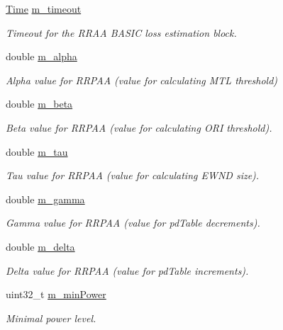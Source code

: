 \begin{DoxyCompactItemize}
\hyperlink{classns3_1_1Time}{Time} \hyperlink{classns3_1_1RrpaaWifiManager_a86e264f2035d972d66a105a9c4c6d5f3}{m\+\_\+timeout}
\begin{DoxyCompactList}\small\item\em Timeout for the R\+R\+AA B\+A\+S\+IC loss estimation block. \end{DoxyCompactList}\item 
double \hyperlink{classns3_1_1RrpaaWifiManager_ad2dee5b7cd74a92d50467b2bae11263c}{m\+\_\+alpha}
\begin{DoxyCompactList}\small\item\em Alpha value for R\+R\+P\+AA (value for calculating M\+TL threshold) \end{DoxyCompactList}\item 
double \hyperlink{classns3_1_1RrpaaWifiManager_a0b6ca1511f7b4e0bebea6418b8fbf4eb}{m\+\_\+beta}
\begin{DoxyCompactList}\small\item\em Beta value for R\+R\+P\+AA (value for calculating O\+RI threshold). \end{DoxyCompactList}\item 
double \hyperlink{classns3_1_1RrpaaWifiManager_aa92c842dd6d783f3ebf0c0fbcf6984d3}{m\+\_\+tau}
\begin{DoxyCompactList}\small\item\em Tau value for R\+R\+P\+AA (value for calculating E\+W\+ND size). \end{DoxyCompactList}\item 
double \hyperlink{classns3_1_1RrpaaWifiManager_ac328ed40e8e145afd21934caf52898b4}{m\+\_\+gamma}
\begin{DoxyCompactList}\small\item\em Gamma value for R\+R\+P\+AA (value for pd\+Table decrements). \end{DoxyCompactList}\item 
double \hyperlink{classns3_1_1RrpaaWifiManager_aca7d4b5e9e8758b935433bc5c9ad24af}{m\+\_\+delta}
\begin{DoxyCompactList}\small\item\em Delta value for R\+R\+P\+AA (value for pd\+Table increments). \end{DoxyCompactList}\item 
uint32\+\_\+t \hyperlink{classns3_1_1RrpaaWifiManager_a2df897d246e52f36e94520c70a9026ab}{m\+\_\+min\+Power}
\begin{DoxyCompactList}\small\item\em Minimal power level. \end{DoxyCompactList}\item 

\end{DoxyCompactItemize}
